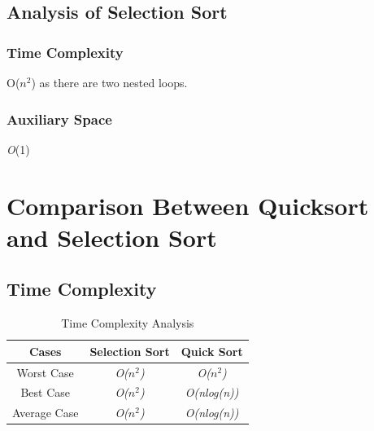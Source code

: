 \documentclass[12pt]{article}
\begin{document}
\subsection{Analysis of Selection Sort}
\subsubsection{Time Complexity}
\par O($n^2$) as there are two nested loops.
\subsubsection{Auxiliary Space}
\textit O(1)
\newpage
\section{Comparison Between Quicksort and Selection Sort}
\subsection{Time Complexity}
\vspace{-5pt}
\begin{table}[h]
    \centering
    \begin{tabular}{|c|c|c|}
         \hline
Cases & Selection Sort & Quick Sort \\
\hline
Worst Case & \textit{O($n^2$)} & \textit{O($n^2$)}\\
\hline
Best Case & \textit{O($n^2$)} & \textit{O(nlog(n))}\\
\hline
Average Case & \textit{O($n^2$)} & \textit{O(nlog(n))}\\
\hline
    \end{tabular}
    \caption{Time Complexity Analysis}
    \label{tab:my_label}
\end{table}
\vspace{-10pt}
\end{document}
